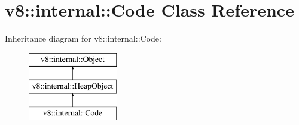 \hypertarget{classv8_1_1internal_1_1_code}{}\section{v8\+:\+:internal\+:\+:Code Class Reference}
\label{classv8_1_1internal_1_1_code}
Inheritance diagram for v8\+:\+:internal\+:\+:Code\+:\begin{figure}[H]
\begin{center}
\leavevmode
\includegraphics[height=3.000000cm]{classv8_1_1internal_1_1_code}
\end{center}
\end{figure}
